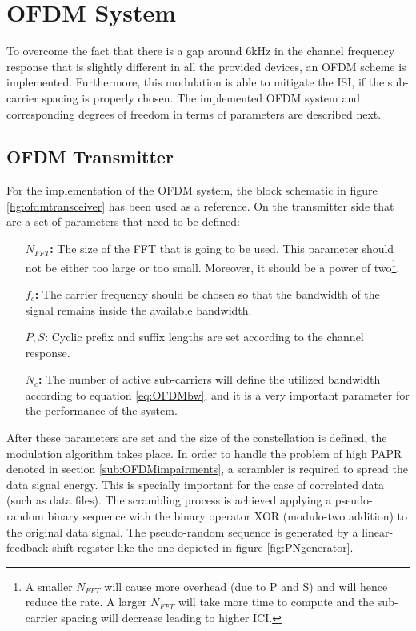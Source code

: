 \documentclass[12pt,a4paper,openright]{report}
\begin{document}
\section{OFDM System}
\label{sec:OFDMmethod}
To overcome the fact that there is a gap around 6kHz in the channel frequency response that is slightly different in all the provided devices, an OFDM scheme is implemented. Furthermore, this modulation is able to mitigate the ISI, if the sub-carrier spacing is properly chosen. The implemented OFDM system and corresponding degrees of freedom in terms of parameters are described next.
 
\subsection{OFDM Transmitter}
\label{sub:OFDMTXmethod}
For the implementation of the OFDM system, the block schematic in figure \ref{fig:ofdmtransceiver} has been used as a reference. On the transmitter side that are a set of parameters that need to be defined:
\begin{itemize}
\item [\bf $N_{FFT}$:] The size of the FFT that is going to be used. This parameter should not be either too large or too small. Moreover, it should be a power of two\footnote{A smaller  $N_{FFT}$ will cause more overhead (due to P and S) and will hence reduce the rate. A larger $N_{FFT}$ will take more time to compute and the sub-carrier spacing will decrease leading to higher ICI.}.
%
\item  [\bf $f_c$:] The carrier frequency should be chosen so that the bandwidth of the signal remains inside the available bandwidth.
\item [\bf  $P, S$:] Cyclic prefix and suffix lengths are set according to the channel response.
 \item [\bf $N_c$:] The number of active sub-carriers will define the utilized bandwidth according to equation \ref{eq:OFDMbw}, and it is a very important parameter for the performance of the system. 

\end{itemize}

After these parameters are set and the size of the constellation is defined, the modulation algorithm takes place. In order to handle the problem of high PAPR denoted in section \ref{sub:OFDMimpairments}, a scrambler is required to spread the data signal energy. This is specially important for the case of correlated data (such as data files). The scrambling process is achieved applying a pseudo-random binary sequence with the binary operator XOR (modulo-two addition) to the original data signal. The pseudo-random sequence is generated by a linear-feedback shift register like the one depicted in figure \ref{fig:PNgenerator}.
\end{document}
